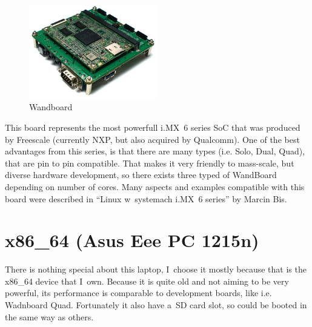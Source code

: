 \documentclass[printmode]{mgr}
\begin{document}
\begin{figure}[htbp]
  \centering
    \includegraphics[width=0.5\textwidth]{wandboard-front.jpg}
  \caption{Wandboard}
  \label{fig:devboard-wandboard}
\end{figure}

This board represents the most powerfull i.MX~6 series SoC that was produced by Freescale (currently NXP, but also acquired by Qualcomm).
One of the best advantages from this series, is that there are many types (i.e. Solo, Dual, Quad), that are pin to pin compatible.
That makes it very friendly to mass-scale, but diverse hardware development, so there exists three typed of WandBoard depending on number of cores.
Many aspects and examples compatible with this board were described in ``Linux w~systemach i.MX~6 series'' by Marcin Bis.\cite{book:lws-imx6}



\section{x86\_64 (Asus Eee PC 1215n)}

There is nothing special about this laptop, I~choose it mostly because that is the x86\_64 device that I~own. Because it is quite old and not aiming to be very powerful, its performance is comparable to development boards, like i.e. Wadnboard Quad. Fortunately it also have a~SD card slot, so could be booted in the same way as others.
\end{document}
